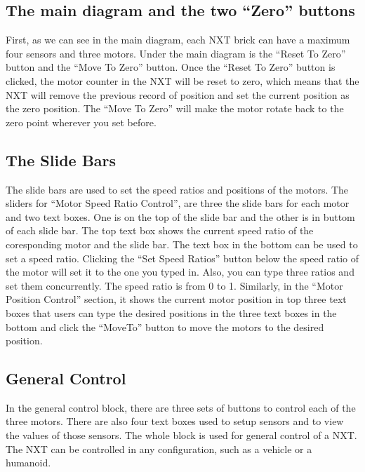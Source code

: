 \documentclass[11pt]{article}
\begin{document}
\subsection{The main diagram and the two ``Zero'' buttons
\label{sec:gui_maindiagram}}
First, as we can see in the main diagram, each NXT brick can have a maximum four
sensors and three motors. Under the main diagram is the ``Reset To Zero'' button
and the ``Move To Zero'' button. Once the ``Reset To Zero'' button is clicked, the
motor counter in the NXT will be reset to zero, which means that the NXT will 
remove the previous record of position and set the current position as the zero
position. The ``Move To Zero'' will make the motor rotate back to the zero point
wherever you set before. 

\subsection{The Slide Bars\label{sec:gui_speedjoint}}
The slide bars are used to set the speed ratios and positions of the motors. The
sliders for ``Motor Speed Ratio Control'', are three the slide bars for each motor 
and two text boxes. One is on the top of the slide bar and the other is in buttom 
of each slide bar. The top text box shows the current speed ratio of the 
coresponding motor and the slide bar. The text box in the bottom can be used to 
set a speed ratio. Clicking the ``Set Speed Ratios'' button below the speed ratio 
of the motor will set it to the one you typed in. Also, you can type three ratios 
and set them concurrently. The speed ratio is from 0 to 1. Similarly, in the 
``Motor Position Control'' section, it shows the current motor position in top three 
text boxes that users can type the desired positions in the three text boxes in 
the bottom and click the ``MoveTo'' button to move the motors to the desired position.

\subsection{General Control\label{sec:gui_generalcontrol}}
In the general control block, there are three sets of buttons to control each of 
the three motors. There are also four text boxes used to setup sensors and to 
view the values of those sensors. The whole block is used for general control of 
a NXT. The NXT can be controlled in any configuration, such as a vehicle or a 
humanoid.\\
\end{document}
